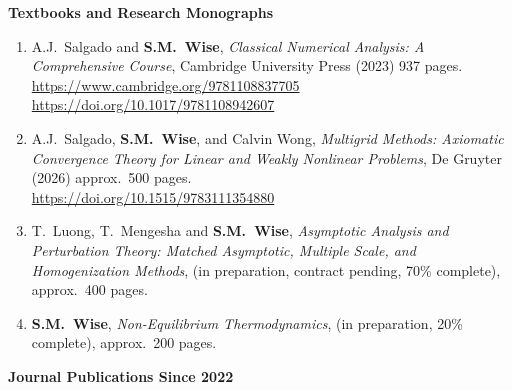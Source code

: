 \documentclass[11pt]{letter}
\begin{document}
{\LARGE\bf  Textbooks and Research Monographs}
    \begin{enumerate}
    \item
A.J.~Salgado and \textbf{S.M.~Wise}, {\sl Classical Numerical Analysis: A Comprehensive Course}, Cambridge University Press (2023) 937 pages.
	\\
\url{https://www.cambridge.org/9781108837705}
	\\
\url{https://doi.org/10.1017/9781108942607}
    \item
A.J.~Salgado, \textbf{S.M.~Wise}, and Calvin Wong, {\sl Multigrid Methods: Axiomatic Convergence Theory for Linear and Weakly Nonlinear Problems}, De Gruyter (2026) approx.~500 pages.
	\\
\url{https://doi.org/10.1515/9783111354880}

	\item
T.~Luong, T.~Mengesha and \textbf{S.M.~Wise}, {\sl Asymptotic Analysis and Perturbation Theory: Matched Asymptotic, Multiple Scale, and Homogenization Methods}, (in preparation, contract pending, 70\% complete), approx.~400 pages.

    \item
\textbf{S.M.~Wise}, {\sl Non-Equilibrium Thermodynamics}, (in preparation, 20\% complete), approx.~200 pages.
    \end{enumerate}


{\LARGE\bf  Journal Publications Since 2022}
\end{document}
